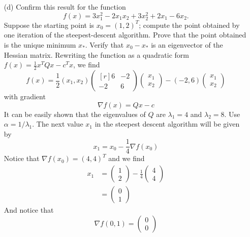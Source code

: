 \documentclass{article}
\begin{document}
\begin{itemize}
\begin{itemize}
        \item[(d)] Confirm this result for the function
        \[f(x) = 3x_1^2 - 2x_1x_2 + 3x_2^2 + 2x_1 - 6x_2.\]
        Suppose the starting point is $x_0 = (1,2)^T$; compute the point obtained by one iteration of the steepest-descent algorithm. Prove that the point obtained is the unique minimum $x_*$. Verify that $x_0 - x_*$ is an eigenvector of the Hessian matrix.
        \newline\newline
        Rewriting the function as a quadratic form $f(x) = \tfrac{1}{2}x^TQx - c^Tx$, we find
        \[f(x) = \frac{1}{2}(x_1,x_2)\begin{pmatrix*}[r]
            6 & -2\\
            -2 & 6
        \end{pmatrix*}\begin{pmatrix}
            x_1\\
            x_2
        \end{pmatrix} - (-2,6)\begin{pmatrix}
            x_1\\
            x_2
        \end{pmatrix}\]
        with gradient
        \[\nabla f(x) = Qx - c\]
        It can be easily shown that the eigenvalues of $Q$ are $\lambda_1 = 4$ and $\lambda_2 = 8$. Use $\alpha = 1/\lambda_1$. The next value $x_1$ in the steepest descent algorithm will be given by
        \[x_1 = x_0 - \frac{1}{4}\nabla f(x_0)\]
        Notice that $\nabla f(x_0) = (4,4)^T$ and we find
        \begin{align*}
            x_1 &= \begin{pmatrix}
                1\\
                2
            \end{pmatrix} - 
            \frac{1}{4} \begin{pmatrix}
                4\\
                4
            \end{pmatrix}\\
            &= \begin{pmatrix}
                0\\
                1
            \end{pmatrix}
        \end{align*}
        And notice that 
        \[\nabla f(0,1) = \begin{pmatrix}
            0\\
            0

\end{pmatrix}\]
\end{itemize}
\end{itemize}
\end{document}
